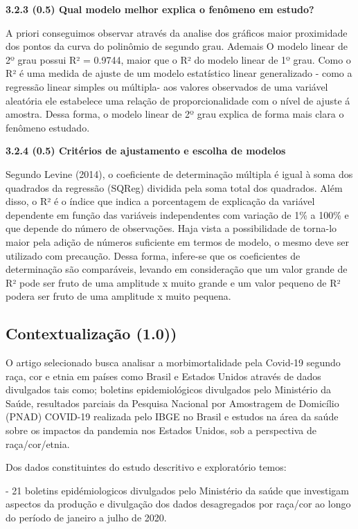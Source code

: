 \documentclass[12pt]{article}\usepackage[]{graphicx}\usepackage[]{color}
\begin{document}
  \textbf{3.2.3 (0.5) Qual modelo melhor explica o fenômeno em estudo?}
  
  A priori conseguimos observar através da analise dos gráficos maior proximidade dos pontos da curva do polinômio de segundo grau. Ademais O modelo linear de 2º grau possui R² = 0.9744, maior que o R² do modelo linear de 1º grau. Como o R² é uma medida de ajuste de um modelo estatístico linear generalizado - como a regressão linear simples ou múltipla- aos valores observados de uma variável aleatória ele estabelece uma relação de proporcionalidade com o nível de ajuste á amostra. Dessa forma, o modelo linear de 2º grau explica de forma mais clara o fenômeno estudado.
  
  \textbf{3.2.4 (0.5) Critérios de ajustamento e escolha de modelos}
  
        Segundo Levine (2014), o coeficiente de determinação múltipla é igual à soma dos quadrados da regressão (SQReg) dividida pela soma total dos quadrados. Além disso, o R² é o índice que indica a porcentagem de explicação da variável dependente em função das variáveis independentes com variação de 1\% a 100\% e que depende do número de observações. Haja vista a possibilidade de torna-lo maior pela adição de números suficiente em termos de modelo, o mesmo deve ser utilizado com precaução.
        Dessa forma, infere-se que os coeficientes de determinação são comparáveis, levando em consideração que um valor grande de R² pode ser fruto de uma amplitude x muito grande e um valor pequeno de R² podera ser fruto de uma amplitude x muito pequena.
\clearpage        
\subsection{ Contextualização (1.0))}
        O artigo selecionado busca analisar a morbimortalidade pela Covid-19 segundo raça, cor e etnia em países como Brasil e Estados Unidos através de dados divulgados tais como; boletins epidemiológicos divulgados pelo Ministério da Saúde, resultados parciais da Pesquisa Nacional por Amostragem de Domicílio (PNAD) COVID-19 realizada pelo IBGE no Brasil e estudos na área da saúde sobre os impactos da pandemia nos Estados Unidos, sob a perspectiva de raça/cor/etnia.
        
        Dos dados constituintes do estudo descritivo e exploratório temos:
        
            - 21 boletins epidémiologicos divulgados pelo Ministério da saúde que investigam aspectos da produção e divulgação dos dados desagregados por
            raça/cor ao longo do período de janeiro a julho de 2020.
            
\end{document}
